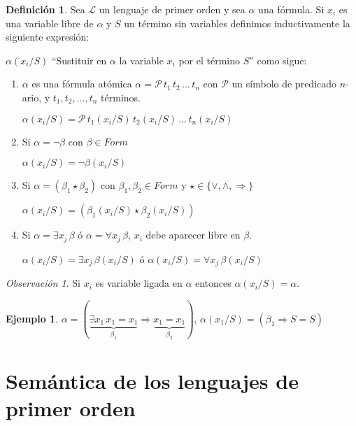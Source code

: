 \documentclass[a4paper,11pt]{article}
\theoremstyle{definition}
\newtheorem{defn}{Definición}[section]
\newtheorem{exap}{Ejemplo}[section]
\theoremstyle{remark}
\newtheorem*{remk}{Observación}
\def\LL{\ensuremath{\mathcal{L}}}
\begin{document}
\begin{defn}
    Sea $\LL$ un lenguaje de primer orden y sea $\alpha$ una fórmula. Si $x_i$ es una variable
    libre de $\alpha$ y $S$ un término sin variables definimos inductivamente la siguiente expresión:
    
    $\alpha(x_i/S)$ ``Sustituir en $\alpha$ la variable $x_i$ por el término $S$'' como sigue:
    
    \begin{enumerate}[label=\emph{\alph*})]
        \item $\alpha$ es una fórmula atómica $\alpha = \mathcal P\,t_1\,t_2\,\dots\,t_n$ con
        $\mathcal P$ un símbolo de predicado $n$-ario, y $t_1, t_2, \dots, t_n$ términos.
        
        $\alpha(x_i/S) = \mathcal P\,t_1(x_i/S)\,t_2(x_i/S)\,\dots\,t_n(x_i/S)$
        
        \item Si $\alpha = \lnot\beta$ con $\beta \in Form$
        
        $\alpha(x_i/S) = \lnot\beta(x_i/S)$
        
        \item Si $\alpha = (\beta_1 \star \beta_2)$ con $\beta_1, \beta_2 \in Form$ y 
        $\star \in \{\lor, \land, \Rightarrow\}$
        
        $\alpha(x_i/S) = (\beta_1(x_i/S) \star \beta_2(x_i/S))$
        
        \item Si $\alpha = \exists x_j\,\beta$ ó $\alpha = \forall x_j\,\beta$, 
        $x_i$ debe aparecer libre en $\beta$.
        
        $\alpha(x_i/S) = \exists x_j\,\beta(x_i/S)$ ó $\alpha(x_i/S) = \forall x_j\,\beta(x_i/S)$
    \end{enumerate}
\end{defn}

\begin{remk}
    Si $x_i$ es variable ligada en $\alpha$ entonces $\alpha(x_i/S) = \alpha$.
\end{remk}

\begin{exap}
    $\alpha = (\underbrace{\exists x_1\,x_1 = x_1}_{\beta_1} \Rightarrow 
    \underbrace{x_1 = x_1}_{\beta_2})$, $\alpha(x_1/S) = (\beta_1 \Rightarrow S = S)$
\end{exap}

\section{Semántica de los lenguajes de primer orden}
\end{document}
